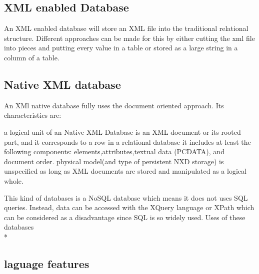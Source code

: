 \subsection{XML enabled Database}

An XML enabled database will store an XML file into the traditional relational structure. Different approaches can be made for this by either cutting the xml file into pieces and putting every value in a table or stored as a large string in a column of a table.
\subsection{Native XML database}

An XMl native database fully uses the document oriented approach. Its characteristics are:

    a logical unit of an Native XML Database is an XML document or its rooted part, and it corresponds to a row in a relational database
    it includes at least the following components: elements,attributes,textual data (PCDATA), and document order.
    physical model(and type of persistent NXD storage) is unspecified as long as XML documents are stored and manipulated as a logical whole.

This kind of databases is a NoSQL database which means it does not uses SQL queries. Instead, data can be accessed with the XQuery language or XPath which can be considered as a disadvantage since SQL is so widely used.
Uses of these databases\\* \cite{ref4}
\subsection{laguage features \cite{ref2}}
